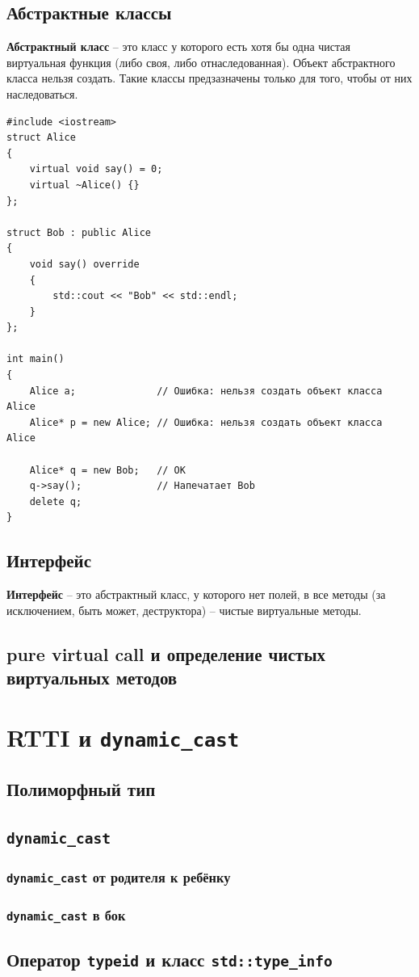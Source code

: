 \documentclass{article}
\begin{document}
\subsection*{Абстрактные классы}
\textbf{Абстрактный класс} -- это класс у которого есть хотя бы одна чистая виртуальная функция (либо своя, либо отнаследованная). Объект абстрактного класса нельзя создать. Такие классы предзазначены только для того, чтобы от них наследоваться.
\begin{lstlisting}
#include <iostream>
struct Alice 
{
    virtual void say() = 0;
    virtual ~Alice() {}
};

struct Bob : public Alice 
{
    void say() override
    {
    	std::cout << "Bob" << std::endl;
    }
};

int main()
{
	Alice a;              // Ошибка: нельзя создать объект класса Alice
	Alice* p = new Alice; // Ошибка: нельзя создать объект класса Alice
	
	Alice* q = new Bob;   // ОК
	q->say();             // Напечатает Bob
	delete q;
}
\end{lstlisting}

\subsection*{Интерфейс}
\textbf{Интерфейс} -- это абстрактный класс, у которого нет полей, в все методы (за исключением, быть может, деструктора) -- чистые виртуальные методы.

\subsection*{pure virtual call и определение чистых виртуальных методов}


\newpage
\section{RTTI и \texttt{dynamic\_cast}}
\subsection*{Полиморфный тип}
\subsection*{\texttt{dynamic\_cast}}

\subsubsection*{\texttt{dynamic\_cast} от родителя к ребёнку}
\subsubsection*{\texttt{dynamic\_cast} в бок}

\subsection*{Оператор \texttt{typeid} и класс \texttt{std::type\_info}}
\end{document}
